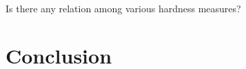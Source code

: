 \documentclass[12pt]{book}
\begin{document}
\begin{quest}\label{que:q1}
      Is there any relation among various hardness measures?
\end{quest}

\section{Conclusion}
\label{sec:Conclusion}

\newpage


\end{document}
